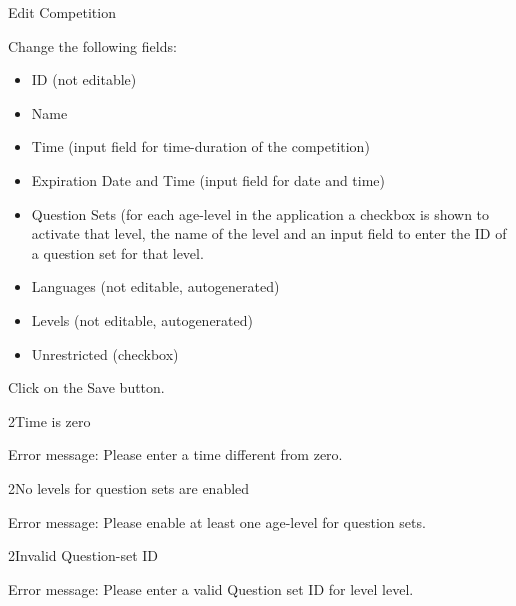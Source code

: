 
\begin{uc}{Edit Competition}


    \begin{uc-mss}
    \item Change the following fields:
        \begin{itemize}
            \item ID (not editable)
            \item Name
            \item Time (input field for time-duration of the competition)
            \item Expiration Date and Time (input field for date and time)
            \item Question Sets (for each age-level in the application a checkbox is shown
            to activate that level, the name of the level and an input field to enter the
            ID of a question set for that level.
            \item Languages (not editable, autogenerated)
            \item Levels (not editable, autogenerated)
            \item Unrestricted (checkbox)
        \end{itemize}
    \item Click on the Save button.
    \end{uc-mss}

    \begin{uc-ext}

        \begin{uc-fail}{2}{Time is zero}
        \item Error message: Please enter a time different from zero.
        \end{uc-fail}

        \begin{uc-fail}{2}{No levels for question sets are enabled}
        \item Error message: Please enable at least one age-level for question sets.
        \end{uc-fail}

        \begin{uc-fail}{2}{Invalid Question-set ID}
        \item Error message: Please enter a valid Question set ID for level {level}.
        \end{uc-fail}


\end{uc-ext}
\end{uc}
